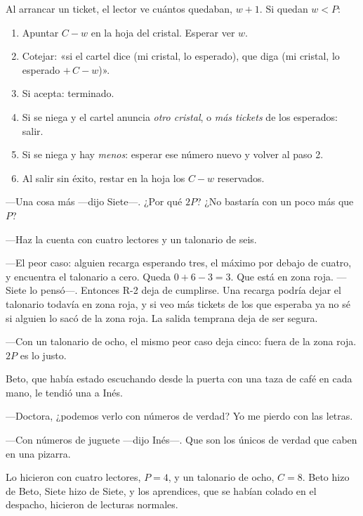 \begin{documento}
Al arrancar un ticket, el lector ve cuántos quedaban, $w+1$. Si quedan $w < P$:
\begin{enumerate}
\item Apuntar $C - w$ en la hoja del cristal. Esperar ver $w$.
\item Cotejar: «si el cartel dice (mi cristal, lo esperado), que diga (mi cristal, lo esperado $+\, C - w$)».
\item Si acepta: terminado.
\item Si se niega y el cartel anuncia \emph{otro cristal}, o \emph{más tickets} de los esperados: salir.
\item Si se niega y hay \emph{menos}: esperar ese número nuevo y volver al paso 2.
\item Al salir sin éxito, restar en la hoja los $C - w$ reservados.
\end{enumerate}
\end{documento}

\escena
---Una cosa más ---dijo Siete---\nobreak. ¿Por qué $2P$? ¿No bastaría con un poco más que $P$?

---Haz la cuenta con cuatro lectores y un talonario de seis.

---El peor caso: alguien recarga esperando tres, el máximo por debajo de cuatro, y encuentra el talonario a cero. Queda $0 + 6 - 3 = 3$. Que está en zona roja. ---Siete lo pensó---\nobreak. Entonces R-2 deja de cumplirse. Una recarga podría dejar el talonario todavía en zona roja, y si veo más tickets de los que esperaba ya no sé si alguien lo sacó de la zona roja. La salida temprana deja de ser segura.

---Con un talonario de ocho, el mismo peor caso deja cinco: fuera de la zona roja. $2P$ es lo justo.

Beto, que había estado escuchando desde la puerta con una taza de café en cada mano, le tendió una a Inés.

---Doctora, ¿podemos verlo con números de verdad? Yo me pierdo con las letras.

---Con números de juguete ---dijo Inés---\nobreak. Que son los únicos de verdad que caben en una pizarra.

\escena
Lo hicieron con cuatro lectores, $P=4$, y un talonario de ocho, $C=8$. Beto hizo de Beto, Siete hizo de Siete, y los aprendices, que se habían colado en el despacho, hicieron de lecturas normales.


